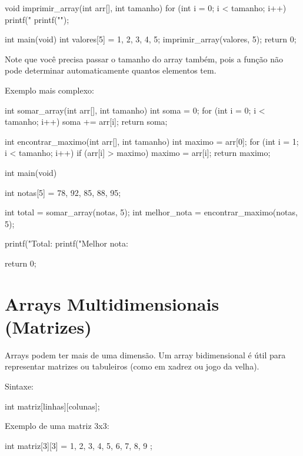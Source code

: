 \begin{ccode}
  void imprimir_array(int arr[], int tamanho) {
    for (int i = 0; i < tamanho; i++) {
      printf("%
    }
    printf("\n");
  }

  int main(void) {
    int valores[5] = {1, 2, 3, 4, 5};
    imprimir_array(valores, 5);
    return 0;
  }
\end{ccode}

Note que você precisa passar o tamanho do array também, pois a função não pode determinar automaticamente quantos elementos tem.

Exemplo mais complexo:

\begin{ccode}
  int somar_array(int arr[], int tamanho) {
    int soma = 0;
    for (int i = 0; i < tamanho; i++) {
      soma += arr[i];
    }
    return soma;
  }

  int encontrar_maximo(int arr[], int tamanho) {
    int maximo = arr[0];
    for (int i = 1; i < tamanho; i++) {
      if (arr[i] > maximo) {
        maximo = arr[i];
      }
    }
    return maximo;
  }

  int main(void) {
    int notas[5] = {78, 92, 85, 88, 95};

    int total = somar_array(notas, 5);
    int melhor_nota = encontrar_maximo(notas, 5);

    printf("Total: %
    printf("Melhor nota: %

    return 0;
  }
\end{ccode}

\section{Arrays Multidimensionais (Matrizes)}

Arrays podem ter mais de uma dimensão. Um array bidimensional é útil para representar matrizes ou tabuleiros (como em xadrez ou jogo da velha).

Sintaxe:

\begin{ccode}
  int matriz[linhas][colunas];
\end{ccode}

Exemplo de uma matriz 3x3:

\begin{ccode}
  int matriz[3][3] = {
    {1, 2, 3},
    {4, 5, 6},
    {7, 8, 9}
  };
\end{ccode}

